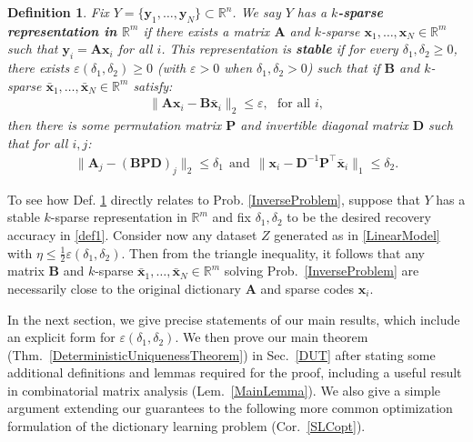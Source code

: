 \documentclass[9pt,twocolumn]{pnas-new}
\newtheorem{definition}{Definition}
\begin{document}
\begin{definition}\label{maindef}
Fix $Y = \{ \mathbf{y}_1, \ldots, \mathbf{y}_N\} \subset \mathbb{R}^n$. We say $Y$ has a \textbf{$k$-sparse representation in $\mathbb{R}^m$} if there exists a matrix $\mathbf{A}$ and $k$-sparse $\mathbf{x}_1, \ldots, \mathbf{x}_N \in \mathbb{R}^m$ such that $\mathbf{y}_i = \mathbf{A}\mathbf{x}_i$ for all $i$. 
This representation is \textbf{stable} if for every $\delta_1, \delta_2 \geq 0$, there exists $\varepsilon(\delta_1, \delta_2) \geq 0$ (with $\varepsilon > 0$ when  $\delta_1, \delta_2 > 0$) such that if $\mathbf{B}$ and $k$-sparse $\mathbf{\bar x}_1, \ldots, \mathbf{\bar x}_N \in \mathbb{R}^m$ satisfy:
\begin{align*}
\|\mathbf{A}\mathbf{x}_i - \mathbf{B}\mathbf{\bar x}_i\|_2 \leq \varepsilon,\ \ \   \text{for all $i$},
\end{align*}
%
then there is some permutation matrix $\mathbf{P}$ and invertible diagonal matrix $\mathbf{D}$ such that for all $i, j$:
\begin{align}\label{def1}
\|\mathbf{A}_j - (\mathbf{BPD})_j\|_2 \leq \delta_1 \ \ \text{and} \ \ \|\mathbf{x}_i - \mathbf{D}^{-1}\mathbf{P}^{\top}\mathbf{\bar x}_i\|_1 \leq \delta_2.
\end{align}
\end{definition}

To see how Def. \ref{maindef} directly relates to Prob. \ref{InverseProblem}, suppose that $Y$ has a stable $k$-sparse representation in $\mathbb{R}^m$ and fix $\delta_1, \delta_2$ to be the desired recovery accuracy in \eqref{def1}. Consider now any dataset $Z$ generated as in \eqref{LinearModel} with $\eta \leq \frac{1}{2} \varepsilon(\delta_1, \delta_2)$. Then from the triangle inequality, it follows that any matrix $\mathbf{B}$ and $k$-sparse $\mathbf{\bar x}_1, \ldots, \mathbf{\bar x}_N \in \mathbb{R}^m$ solving Prob.~\ref{InverseProblem} are necessarily close to the original dictionary $\mathbf{A}$ and sparse codes $\mathbf{x}_i$. 

In the next section, we give precise statements of our main results, which include an explicit form for $\varepsilon(\delta_1, \delta_2)$. We then prove our main theorem (Thm.~\ref{DeterministicUniquenessTheorem}) in Sec.~\ref{DUT} after stating some additional definitions and lemmas required for the proof, including a useful result in combinatorial matrix analysis (Lem.~\ref{MainLemma}). We also give a simple argument extending our guarantees to the following more common optimization formulation of the dictionary learning problem (Cor.~\ref{SLCopt}).
\end{document}
